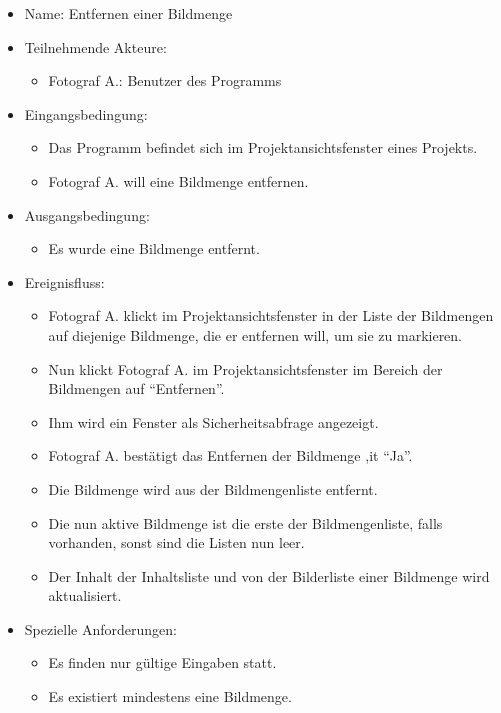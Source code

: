 \begin{itemize}
	\begin{itemize}
		\item Name: Entfernen einer Bildmenge
		\item Teilnehmende Akteure:
		\begin{itemize}
			\item	Fotograf A.: Benutzer des Programms		
		\end{itemize}
		\item Eingangsbedingung:
		\begin{itemize}
			\item	Das Programm befindet sich im Projektansichtsfenster eines Projekts.
			\item Fotograf A. will eine Bildmenge entfernen.
		\end{itemize}
		\item Ausgangsbedingung:
		\begin{itemize}
			\item	Es wurde eine Bildmenge entfernt.	
		\end{itemize}
		\item Ereignisfluss:
		\begin{itemize}
			\item Fotograf A. klickt im Projektansichtsfenster in der Liste der Bildmengen auf diejenige Bildmenge, die er entfernen will, um sie zu markieren.		
			\item Nun klickt Fotograf A. im Projektansichtsfenster im Bereich der Bildmengen auf "`Entfernen"'.
			\item Ihm wird ein Fenster als Sicherheitsabfrage angezeigt.
			\item Fotograf A. bestätigt das Entfernen der Bildmenge ,it "`Ja"'.
			\item Die Bildmenge wird aus der Bildmengenliste entfernt.
			\item Die nun aktive Bildmenge ist die erste der Bildmengenliste, falls vorhanden, sonst sind die Listen nun leer.
			\item Der Inhalt der Inhaltsliste und von der Bilderliste einer Bildmenge wird aktualisiert. 
		\end{itemize}
		\item Spezielle Anforderungen:
		\begin{itemize}
			\item	Es finden nur gültige Eingaben statt.
			\item Es existiert mindestens eine Bildmenge.
		\end{itemize}			
	\end{itemize}
	

\end{itemize}
